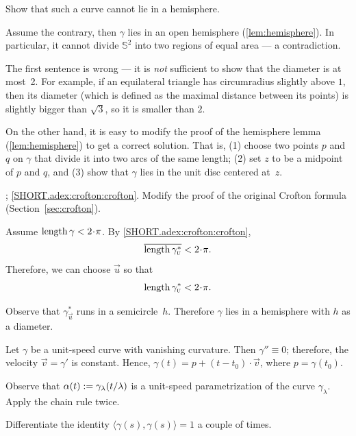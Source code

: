 Show that such a curve cannot lie in a hemisphere.

Assume the contrary, then $\gamma$ lies in an open hemisphere (\ref{lem:hemisphere}).
In particular, it cannot divide $\mathbb{S}^2$ into two regions of equal area --- a contradiction.

The first sentence is wrong --- it is \textit{not} sufficient to show that the diameter is at most~2.
For example, if an equilateral triangle has circumradius slightly above $1$,
then its diameter (which is defined as the maximal distance between its points) is slightly bigger than $\sqrt3$, so it is smaller than $2$.

On the other hand, it is easy to modify the proof of the hemisphere lemma (\ref{lem:hemisphere}) to get a correct solution.
That is, (1) choose two points $p$ and $q$ on $\gamma$ that divide it into two arcs of the same length;
(2) set $z$ to be a midpoint of $p$ and $q$,
and (3) show that $\gamma$ lies in the unit disc centered at~$z$.


\parbf{\ref{adex:crofton}}; \ref{SHORT.adex:crofton:crofton}.
Modify the proof of the original Crofton formula
(Section~\ref{sec:crofton}).

Assume $\length \gamma<2\cdot\pi$.
By \ref{SHORT.adex:crofton:crofton},
\[\overline{\length \gamma^*_{\vec u}}<2\cdot\pi.\]
Therefore, we can choose ${\vec u}$ so that 
\[\length \gamma^*_{\vec u}<2\cdot\pi.\]

Observe that $\gamma^*_{\vec u}$ runs in a semicircle~$h$.
Therefore $\gamma$ lies in a hemisphere with $h$ as a diameter.


\setcounter{eqtn}{0}


Let $\gamma$ be a unit-speed curve with vanishing curvature.
Then $\gamma''\equiv 0$; therefore, the velocity $\vec v=\gamma'$ is constant.
Hence, $\gamma(t)=p+(t-t_0)\cdot \vec v$, where $p=\gamma(t_0)$.


Observe that $\alpha(t)\mathrel{:=}\gamma_{\lambda}(t/\lambda)$ is a unit-speed parametrization of the curve $ \gamma_{\lambda}$.
Apply the chain rule twice.


 Differentiate the identity $\langle\gamma(s),\gamma(s)\rangle=1$ a couple of times.

